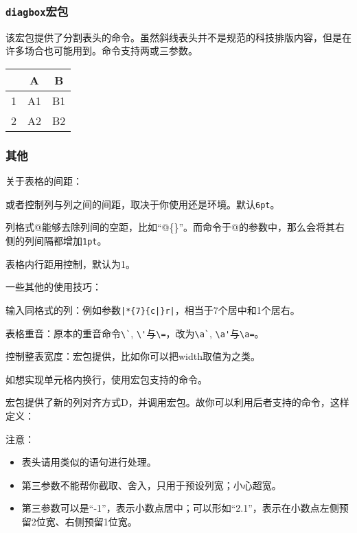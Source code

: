 \subsubsection{\texttt{diagbox}宏包}
该宏包提供了分割表头的命令。虽然斜线表头并不是规范的科技排版内容，但是在许多场合也可能用到。命令支持两或三参数。
\begin{codeshow}
\begin{tabular}{c|cc}
\diagbox{左边}{中间}{右边} & A & B \\
\hline
1 & A1 & B1 \\
2 & A2 & B2 
\end{tabular}
\end{codeshow}

\subsubsection{其他}
关于表格的间距：
\begin{feai}
\item {}或者控制列与列之间的间距，取决于你使用还是环境。默认\texttt{6pt}。
\item 列格式@能够去除列间的空距，比如“@\{\}”。而命令于@的参数中，那么会将其右侧的列间隔都增加\texttt{1pt}。
\item 表格内行距用控制，默认为1。
\end{feai}

一些其他的使用技巧：
\begin{feae}
\item 输入同格式的列：例如参数\verb+|*{7}{c|}r|+，相当于7个居中和1个居右。
\item 表格重音：原本的重音命令\verb|\`|, \verb|\'|与\verb|\=|，改为\verb|\a`|, \verb|\a'|与\verb|\a=|。
\item 控制整表宽度：宏包提供，比如你可以把width取值为之类。
\item 如想实现单元格内换行，使用宏包支持的命令。
\item 宏包提供了新的列对齐方式D，并调用宏包。故你可以利用后者支持的命令，这样定义：
注意：\begin{itemize}
\item 表头请用类似的语句进行处理。
\item 第三参数不能帮你截取、舍入，只用于预设列宽；小心超宽。
\item 第三参数可以是“-1”，表示小数点居中；可以形如“2.1”，表示在小数点左侧预留2位宽、右侧预留1位宽。
\end{itemize}
\end{feae}

